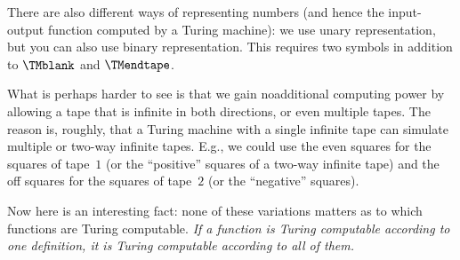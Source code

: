 \documentclass[../../../include/open-logic-section]{subfiles}
\begin{document}
There are also different ways of representing numbers (and hence the
input-output function computed by a Turing machine): we use unary
representation, but you can also use binary representation. This
requires two symbols in addition to $\TMblank$ and $\TMendtape$.

What is perhaps harder to see is that we gain noadditional computing
power by allowing a tape that is infinite in both directions, or even
multiple tapes. The reason is, roughly, that a Turing machine with a
single infinite tape can simulate multiple or two-way infinite tapes.
E.g., we could use the even squares for the squares of tape~$1$ (or
the ``positive'' squares of a two-way infinite tape) and the off
squares for the squares of tape~$2$ (or the ``negative'' squares).

Now here is an interesting fact: none of these variations matters as
to which functions are Turing computable. \emph{If a function is Turing
computable according to one definition, it is Turing computable
according to all of them.}  
\end{document}
